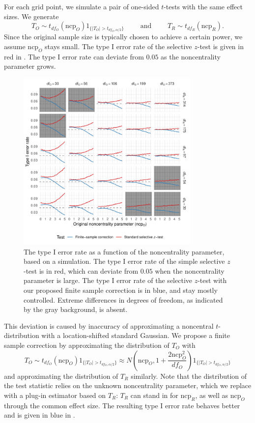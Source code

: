 \documentclass[11pt]{article}
\theoremstyle{definition}
\theoremstyle{custom}
\begin{document}
  For each grid point, we simulate a pair of one-sided $t$-tests with the same effect sizes. We generate
  \[
    T_O \sim t_{df_O}(\text{ncp}_O) 1_{\{|T_O| > t_{df_O, \alpha/2}\}} \qquad \text{ and } \qquad T_R \sim t_{df_R}(\text{ncp}_R).
  \]
  Since the original sample size is typically chosen to achieve a certain power, we assume $\text{ncp}_O$ stays small. The type I error rate of the selective $z$-test is given in red in . The type I error rate can deviate from $0.05$ as the noncentrality parameter grows.
  \begin{figure}[htbp]
    \centering
    \includegraphics[width=0.8\textwidth]{t-approx}
    \caption{The type I error rate as a function of the noncentrality parameter, based on a simulation. The type I error rate of the simple selective $z$-test is in red, which can deviate from $0.05$ when the noncentrality parameter is large. The type I error rate of the selective $z$-test with our proposed finite sample correction is in blue, and stay mostly controlled. Extreme differences in degrees of freedom, as indicated by the gray background, is absent.}
  \label{fig:t-approx}
  \end{figure}

  This deviation is caused by inaccuracy of approximating a noncentral $t$-distribution with a location-shifted standard Gaussian. We propose a finite sample correction by approximating the distribution of $T_O$ with
  \[
    T_O \sim t_{df_O}(\text{ncp}_O) 1_{\{|T_O| > t_{df_O, \alpha/2}\}} \approx N\left(\text{ncp}_O, 1 + \frac{2\text{ncp}_O^2}{df_O}\right) 1_{\{|T_O| > t_{df_O, \alpha/2}\}}
  \]
  and approximating the distribution of $T_R$ similarly. Note that the distribution of the test statistic relies on the unknown noncentrality parameter, which we replace with a plug-in estimator based on $T_R$: $T_R$ can stand in for $\text{ncp}_R$, as well as $\text{ncp}_O$ through the common effect size. The resulting type I error rate behaves better and is given in blue in .
\end{document}
